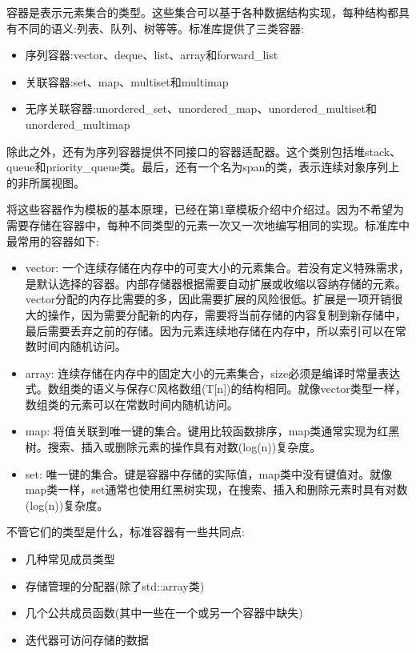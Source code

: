容器是表示元素集合的类型。这些集合可以基于各种数据结构实现，每种结构都具有不同的语义:列表、队列、树等等。标准库提供了三类容器:

\begin{itemize}
\item
序列容器:vector、deque、list、array和forward\_list

\item
关联容器:set、map、multiset和multimap

\item
无序关联容器:unordered\_set、unordered\_map、unordered\_multiset和unordered\_multimap
\end{itemize}

除此之外，还有为序列容器提供不同接口的容器适配器。这个类别包括堆stack、queue和priority\_queue类。最后，还有一个名为span的类，表示连续对象序列上的非所属视图。

将这些容器作为模板的基本原理，已经在第1章模板介绍中介绍过。因为不希望为需要存储在容器中，每种不同类型的元素一次又一次地编写相同的实现。标准库中最常用的容器如下:

\begin{itemize}
\item
vector: 一个连续存储在内存中的可变大小的元素集合。若没有定义特殊需求，是默认选择的容器。内部存储器根据需要自动扩展或收缩以容纳存储的元素。vector分配的内存比需要的多，因此需要扩展的风险很低。扩展是一项开销很大的操作，因为需要分配新的内存，需要将当前存储的内容复制到新存储中，最后需要丢弃之前的存储。因为元素连续地存储在内存中，所以索引可以在常数时间内随机访问。

\item
array: 连续存储在内存中的固定大小的元素集合，size必须是编译时常量表达式。数组类的语义与保存C风格数组(T[n])的结构相同。就像vector类型一样，数组类的元素可以在常数时间内随机访问。

\item
map: 将值关联到唯一键的集合。键用比较函数排序，map类通常实现为红黑树。搜索、插入或删除元素的操作具有对数(log(n))复杂度。

\item
set: 唯一键的集合。键是容器中存储的实际值，map类中没有键值对。就像map类一样，set通常也使用红黑树实现，在搜索、插入和删除元素时具有对数(log(n))复杂度。
\end{itemize}

不管它们的类型是什么，标准容器有一些共同点:

\begin{itemize}
\item
几种常见成员类型

\item
存储管理的分配器(除了std::array类)

\item
几个公共成员函数(其中一些在一个或另一个容器中缺失)

\item
迭代器可访问存储的数据
\end{itemize}

